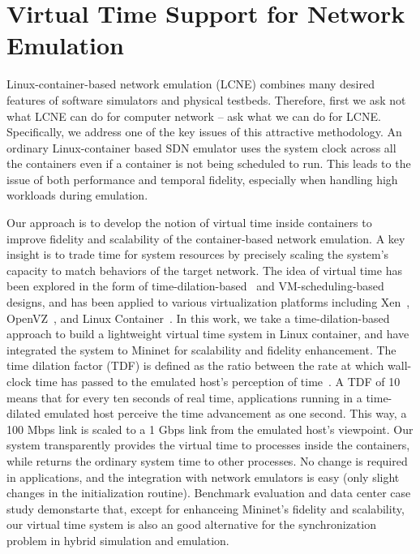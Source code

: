 \section{Virtual Time Support for Network Emulation}
\label{VT:Sec:Intro}

Linux-container-based network emulation (LCNE) combines many desired features of software simulators and physical testbeds.
Therefore, first we ask not what LCNE can do for computer network -- ask what we can do for LCNE.
Specifically, we address one of the key issues of this attractive methodology.
An ordinary Linux-container based SDN emulator uses the system clock across all the containers even if a container is not being scheduled to run.
This leads to the issue of both performance and temporal fidelity, especially when handling high workloads during emulation.

Our approach is to develop the notion of virtual time inside containers to improve fidelity and scalability of the container-based network emulation.
A key insight is to trade time for system resources by precisely scaling the system's capacity to match behaviors of the target network.
The idea of virtual time has been explored in the form of time-dilation-based~\cite{ToInfinityBeyond} and
VM-scheduling-based~\cite{VirtTimeOpenVZ, SliceTime} designs, and has been applied to various virtualization platforms including Xen~\cite{DieCast},
OpenVZ~\cite{VirtTimeOpenVZ}, and Linux Container~\cite{TimeKeeper}.
In this work, we take a time-dilation-based approach to build a lightweight virtual time system in Linux container,
and have integrated the system to Mininet for scalability and fidelity enhancement.
The time dilation factor (TDF) is defined as the ratio between the rate at which wall-clock time has
passed to the emulated host's perception of time~\cite{ToInfinityBeyond}.
A TDF of 10 means that for every ten seconds of real time, applications running in a time-dilated emulated host perceive the time advancement as one second.
This way, a 100 Mbps link is scaled to a 1 Gbps link from the emulated host's viewpoint.
Our system transparently provides the virtual time to processes inside the containers,
while returns the ordinary system time to other processes.
No change is required in applications, and the integration with network emulators is easy (only slight changes in the initialization routine).
Benchmark evaluation and data center case study demonstarte that, except for enhanceing Mininet's fidelity and scalability,
our virtual time system is also an good alternative for the synchronization problem in hybrid simulation and emulation.


